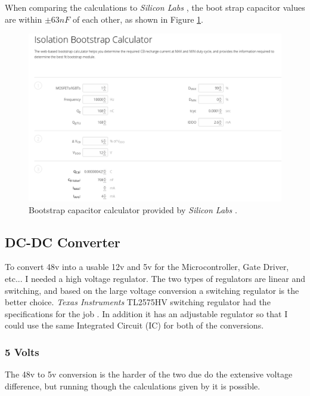 \documentclass{article}
\begin{document}
		\noindent When comparing the calculations to \textit{Silicon Labs} \cite{silabs}, the boot strap capacitor values are within $\pm 63nF$ of each other, as shown in Figure \ref{fig:silabsCalc}.
	
		\begin{figure}[h!]
			\begin{center}
				\includegraphics[scale=0.3]{silabs_bootstrap_cap}
			\end{center}
			\caption{Bootstrap capacitor calculator provided by \textit{Silicon Labs} \cite{silabs}.}
			\label{fig:silabsCalc}
		\end{figure}
	
		\subsection{DC-DC Converter}
		To convert 48v into a usable 12v and 5v for the Microcontroller, Gate Driver, etc... I needed a high voltage regulator.  The two types of regulators are linear and switching, and based on the large voltage conversion a switching regulator is the better choice.  \textit{Texas Instruments} TL2575HV switching regulator had the specifications for the job \cite{buck converter}.  In addition it has an adjustable regulator so that I could use the same Integrated Circuit (IC) for both of the conversions.
	
		\subsubsection{5 Volts}
		The 48v to 5v conversion is the harder of the two due do the extensive voltage difference, but running though the calculations given by \cite{buck converter} it is possible.
		
\end{document}
